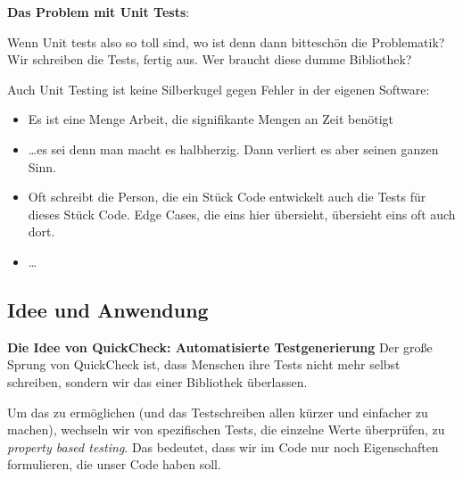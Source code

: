 \documentclass{beamer}
\begin{document}

\begin{frame}
\textbf{Das Problem mit Unit Tests}:
\bigskip

Wenn Unit tests also so toll sind, wo ist denn dann bitteschön die Problematik? Wir schreiben
die Tests, fertig aus. Wer braucht diese dumme Bibliothek?
\pause
\bigskip

Auch Unit Testing ist keine Silberkugel gegen Fehler in der eigenen Software:\pause

\begin{itemize}
\item Es ist eine Menge Arbeit, die signifikante Mengen an Zeit benötigt\pause
\item \dots es sei denn man macht es halbherzig. Dann verliert es aber seinen ganzen Sinn.\pause
\item Oft schreibt die Person, die ein Stück Code entwickelt auch die Tests für dieses Stück Code. Edge Cases, die eins hier übersieht, übersieht eins oft auch dort.\pause
\item \dots
\end{itemize}
\end{frame}

\subsection{Idee und Anwendung}

\begin{frame}
\textbf{Die Idee von QuickCheck: Automatisierte Testgenerierung}
\bigskip
Der große Sprung von QuickCheck ist, dass Menschen ihre Tests nicht mehr selbst schreiben,
sondern wir das einer Bibliothek überlassen. 
\pause 
\smallskip\smallskip

Um das zu ermöglichen (und das Testschreiben allen kürzer und einfacher zu machen), wechseln
wir von spezifischen Tests, die einzelne Werte überprüfen, zu \emph{property based testing}. Das bedeutet, dass wir im Code nur noch Eigenschaften formulieren, die unser Code haben soll.

\end{frame}

\end{document}
